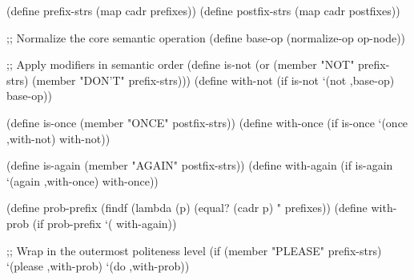 \begin{CodeBlock}
(define prefix-strs (map cadr prefixes))
(define postfix-strs (map cadr postfixes))

;; Normalize the core semantic operation
(define base-op (normalize-op op-node))

;; Apply modifiers in semantic order
(define is-not
  (or (member "NOT" prefix-strs)
      (member "DON'T" prefix-strs)))
(define with-not
  (if is-not `(not ,base-op) base-op))

(define is-once (member "ONCE" postfix-strs))
(define with-once
  (if is-once `(once ,with-not) with-not))

(define is-again (member "AGAIN" postfix-strs))
(define with-again
  (if is-again `(again ,with-once) with-once))

(define prob-prefix
  (findf (lambda (p)
           (equal? (cadr p) "%
         prefixes))
(define with-prob
  (if prob-prefix
      `(%
      with-again))

;; Wrap in the outermost politeness level
(if (member "PLEASE" prefix-strs)
    `(please ,with-prob)
    `(do ,with-prob))
\end{CodeBlock}
